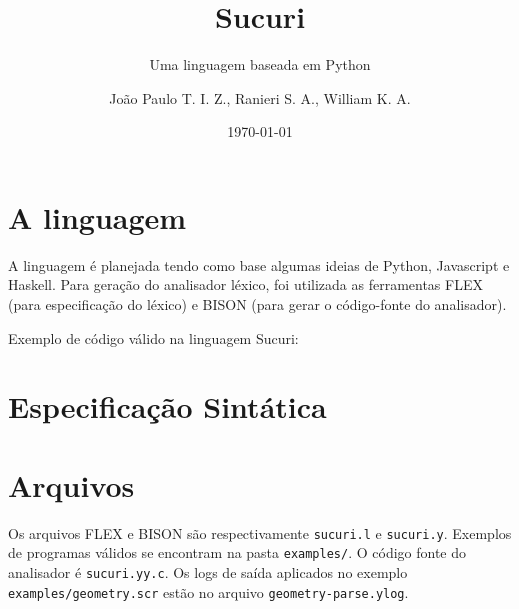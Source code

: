 \documentclass[headings=standardclasses, headings=big]{scrreprt}
\title{Sucuri}
\subtitle{Uma linguagem baseada em Python}
\author{João Paulo T. I. Z., Ranieri S. A., William K. A.}
\date{\today}
\begin{document}
\maketitle

\clearpage

\section{A linguagem}

A linguagem é planejada tendo como base algumas ideias de Python, Javascript e
Haskell. Para geração do analisador léxico, foi utilizada as ferramentas FLEX
(para especificação do léxico) e BISON (para gerar o código-fonte do
analisador).

Exemplo de código válido na linguagem Sucuri:



\clearpage

\section{Especificação Sintática}



\clearpage

\section{Arquivos}

Os arquivos FLEX e BISON são respectivamente \texttt{sucuri.l} e
\texttt{sucuri.y}. Exemplos de programas válidos se encontram na pasta
\texttt{examples/}. O código fonte do analisador é \texttt{sucuri.yy.c}.  Os
logs de saída aplicados no exemplo \texttt{examples/geometry.scr} estão no
arquivo \texttt{geometry-parse.ylog}.
\end{document}
